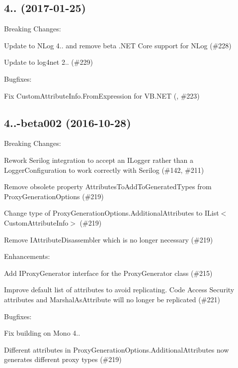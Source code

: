 \subsection*{4.. (2017-\/01-\/25)}

Breaking Changes\+:
\begin{DoxyItemize}
\item Update to N\+Log 4.. and remove beta .N\+ET Core support for N\+Log (\#228)
\item Update to log4net 2.. (\#229)
\end{DoxyItemize}

Bugfixes\+:
\begin{DoxyItemize}
\item Fix Custom\+Attribute\+Info.\+From\+Expression for V\+B.\+N\+ET (, \#223)
\end{DoxyItemize}

\subsection*{4..-\/beta002 (2016-\/10-\/28)}

Breaking Changes\+:
\begin{DoxyItemize}
\item Rework Serilog integration to accept an I\+Logger rather than a Logger\+Configuration to work correctly with Serilog (\#142, \#211)
\item Remove obsolete property {\ttfamily Attributes\+To\+Add\+To\+Generated\+Types} from {\ttfamily Proxy\+Generation\+Options} (\#219)
\item Change type of {\ttfamily Proxy\+Generation\+Options.\+Additional\+Attributes} to {\ttfamily I\+List$<$Custom\+Attribute\+Info$>$} (\#219)
\item Remove {\ttfamily I\+Attribute\+Disassembler} which is no longer necessary (\#219)
\end{DoxyItemize}

Enhancements\+:
\begin{DoxyItemize}
\item Add I\+Proxy\+Generator interface for the Proxy\+Generator class (\#215)
\item Improve default list of attributes to avoid replicating. Code Access Security attributes and Marshal\+As\+Attribute will no longer be replicated (\#221)
\end{DoxyItemize}

Bugfixes\+:
\begin{DoxyItemize}
\item Fix building on Mono 4..
\item Different attributes in {\ttfamily Proxy\+Generation\+Options.\+Additional\+Attributes} now generates different proxy types (\#219)
\end{DoxyItemize}

